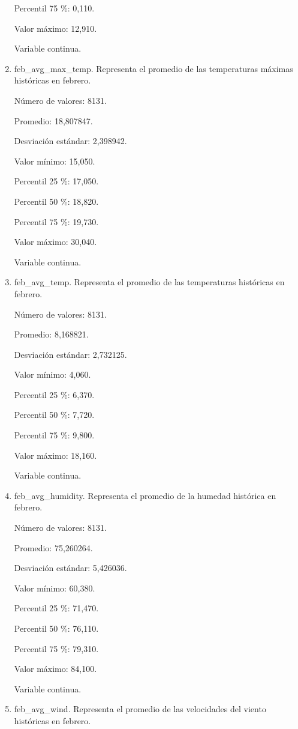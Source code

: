 \begin{enumerate}
	Percentil 75 \%: 0,110.
	
	Valor máximo: 12,910.
	
	Variable continua.

	\item feb\_avg\_max\_temp. Representa el promedio de las temperaturas máximas históricas en febrero.
	
	Número de valores: 8131.
	
	Promedio: 18,807847.
	
	Desviación estándar: 2,398942.
	
	Valor mínimo: 15,050.
	
	Percentil 25 \%: 17,050.
	
	Percentil 50 \%: 18,820.
	
	Percentil 75 \%: 19,730.
	
	Valor máximo: 30,040.
	
	Variable continua.

	\item feb\_avg\_temp. Representa el promedio de las temperaturas históricas en febrero.
	
	Número de valores: 8131.
	
	Promedio: 8,168821.
	
	Desviación estándar: 2,732125.
	
	Valor mínimo: 4,060.
	
	Percentil 25 \%: 6,370.
	
	Percentil 50 \%: 7,720.
	
	Percentil 75 \%: 9,800.
	
	Valor máximo: 18,160.
	
	Variable continua.

	\item feb\_avg\_humidity. Representa el promedio de la humedad histórica en febrero.
	
	Número de valores: 8131.
	
	Promedio: 75,260264.
	
	Desviación estándar: 5,426036.
	
	Valor mínimo: 60,380.
	
	Percentil 25 \%: 71,470.
	
	Percentil 50 \%: 76,110.
	
	Percentil 75 \%: 79,310.
	
	Valor máximo: 84,100.
	
	Variable continua.

	\item feb\_avg\_wind. Representa el promedio de las velocidades del viento históricas en febrero.
	

\end{enumerate}
